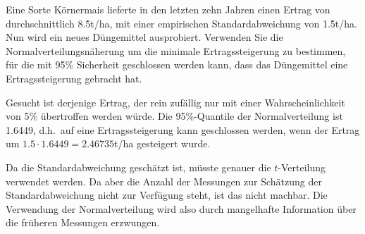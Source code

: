 Eine Sorte Körnermais lieferte in den letzten zehn Jahren
einen Ertrag von durchschnittlich
8.5t/ha, mit einer empirischen Standardabweichung von 1.5t/ha.
Nun wird ein neues Düngemittel ausprobiert.
Verwenden Sie die Normalverteilungsnäherung um die minimale
Ertragssteigerung zu bestimmen, für die mit 95\% Sicherheit geschlossen
werden kann, dass das Düngemittel eine Ertragssteigerung gebracht hat.


\begin{loesung}
Gesucht ist derjenige Ertrag, der rein zufällig nur mit einer
Wahrscheinlichkeit
von 5\% übertroffen werden würde.
Die 95\%-Quantile der
Normalverteilung ist 1.6449, d.h.~auf eine Ertragssteigerung kann
geschlossen werden, wenn der Ertrag um
$1.5\cdot 1.6449=2.46735$t/ha gesteigert wurde.
\end{loesung}

\begin{diskussion}
Da die Standardabweichung geschätzt ist, müsste genauer die $t$-Verteilung
verwendet werden.
Da aber die Anzahl der Messungen zur Schätzung der Standardabweichung nicht
zur Verfügung steht, ist das nicht machbar.
Die Verwendung der Normalverteilung wird also durch mangelhafte Information
über die früheren Messungen erzwungen.
\end{diskussion}
